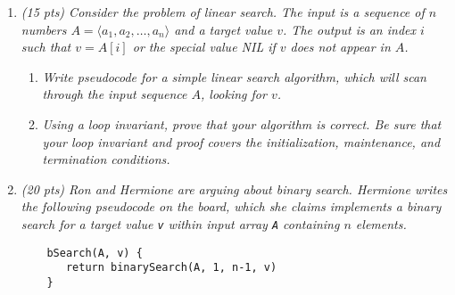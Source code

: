 \documentclass[12pt]{article}
\newcommand{\makenonemptybox}[2]{%
\item[]
\fbox{%
\parbox[c][#1][t]{\dimexpr\linewidth-2\fboxsep-2\fboxrule}{
  \hrule width \hsize height 0pt
  #2
 }%
}%
\par\vspace{\ht\strutbox}
}
\begin{document}
\begin{enumerate}
\begin{enumerate}
	\item \label{stocks:c} {\itshape Dumbledore knows you know that {\tt makeWizardMoney} is wildly inefficient. With a wink, he suggests writing a function to make a new array $M$ of size $n$ such that
	\begin{align}
	M[i] = \min_{0\,\leq\, j\, \leq \,i} ~A[j] \nonumber \enspace .
	\end{align}
	That is, $M[i]$ gives the minimum value in the subarray of $A[0 .. i]$.
	
	Write pseudocode to compute the array $M$. What is the running time complexity of your pseudocode? Write your answer as a $\Theta$ bound in terms of $n$.}
	\pagebreak
	
	\item \label{stocks:d} {\itshape Use the array $M$ computed from (\ref{stocks:c}) to compute the maximum coin return in time $\Theta(n)$.}
	\makenonemptybox{2in}{}
	
	\item \label{stocks:e} {\itshape Give Dumbledore what he wants:\ rewrite the original algorithm in a way that combine parts (\ref{stocks:b})--(\ref{stocks:d}) to avoid creating a new array $M$.}
	\pagebreak
	\end{enumerate}


		\renewcommand{\headsep}{36pt}

	\item {\itshape (15 pts) Consider the problem of linear search. The input is a sequence of $n$ numbers $A=\langle a_{1},a_{2},\dots,a_{n}\rangle$ and a target value $v$. The output is an index $i$ such that $v=A[i]$ or the special value NIL if $v$ does not appear in $A$.}
	
	\begin{enumerate}
	\item \label{3a} {\itshape Write pseudocode for a simple linear search algorithm, which will scan through the input sequence $A$, looking for $v$.}
	\pagebreak
	
	\item \label{3b} {\itshape Using a loop invariant, prove that your algorithm is correct. Be sure that your loop invariant and proof covers the initialization, maintenance, and termination conditions.}
	\pagebreak
	\end{enumerate}
	
	
	
	\item {\itshape (20 pts) Ron and Hermione are arguing about binary search. Hermione writes the following pseudocode on the board, which she claims implements a binary search for a target value {\tt v} within input array {\tt A} containing $n$ elements.
	\begin{small}
	\begin{verbatim}
	bSearch(A, v) {
	   return binarySearch(A, 1, n-1, v)
	}
	

\end{verbatim}
\end{small}}
\end{enumerate}
\end{document}
